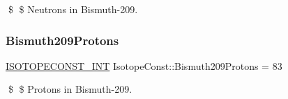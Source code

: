 \$ \$ Neutrons in Bismuth-\/209. \mbox{\label{group___isotope_const-_bismuth-_bi209_ga1e81e7aada2efc8201cb6afcabf527ff}} 
\subsubsection{\texorpdfstring{Bismuth209\+Protons}{Bismuth209Protons}}
{\footnotesize\ttfamily \mbox{\hyperlink{group___isotope_const-_macros_ga5f18360b3e99483a35c32d789e62621c}{I\+S\+O\+T\+O\+P\+E\+C\+O\+N\+S\+T\+\_\+\+I\+NT}} Isotope\+Const\+::\+Bismuth209\+Protons = 83}

\$ \$ Protons in Bismuth-\/209. 